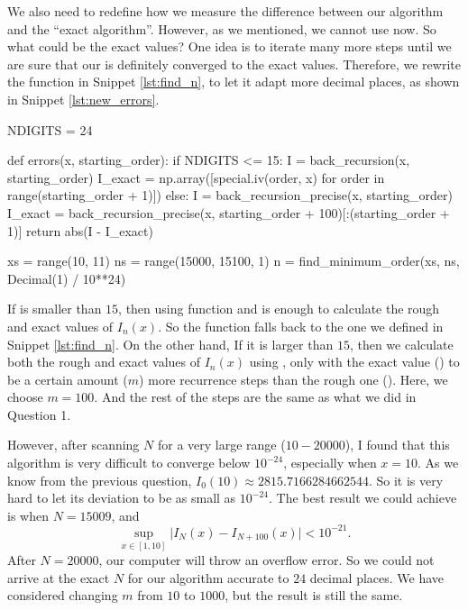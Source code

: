 We also need to redefine how we measure the difference between our algorithm and the
``exact algorithm''. However, as we mentioned, we cannot use  now.
So what could be the exact values?
One idea is to iterate many more steps until we are sure that our
 is definitely converged to the exact values.
Therefore, we rewrite the function  in Snippet \ref{lst:find_n},
to let it adapt more decimal places, as shown in Snippet \ref{lst:new_errors}.

\begin{algorithm}
    \caption{}
    \label{lst:new_errors}
    \begin{pythoncode}
        NDIGITS = 24


        def errors(x, starting_order):
            if NDIGITS <= 15:
                I = back_recursion(x, starting_order)
                I_exact = np.array([special.iv(order, x) for order in range(starting_order + 1)])
            else:
                I = back_recursion_precise(x, starting_order)
                I_exact = back_recursion_precise(x, starting_order + 100)[:(starting_order + 1)]
            return abs(I - I_exact)


        xs = range(10, 11)
        ns = range(15000, 15100, 1)
        n = find_minimum_order(xs, ns, Decimal(1) / 10**24)
        \end{pythoncode}
\end{algorithm}

If  is smaller than $15$, then using function  and
 is enough to calculate the rough and exact values of $I_n(x)$. So the
 function falls back to the one we defined in Snippet \ref{lst:find_n}. On the
other hand, If it is larger than $15$, then we calculate both the rough and exact values of
$I_n(x)$ using , only with the exact value () to
be a certain amount ($m$) more recurrence steps than the rough one (). Here, we
choose $m = 100$.
And the rest of the steps are the same as what we did in Question 1.

However, after scanning $N$ for a very large range ($10 - 20000$), I found that this
algorithm is very difficult to converge below $10^{-24}$, especially when $x = 10$.
As we know from the previous question, $I_0(10) \approx 2815.7166284662544$. So it is
very hard to let its deviation to be as small as $10^{-24}$. The best result we
could achieve is when $N = 15009$, and
%
\begin{equation}
    \sup_{x \in [1, 10]} \lvert I_{N}(x) - I_{N+100}(x) \rvert < 10^{-21}.
\end{equation}
%
After $N = 20000$, our computer will throw an overflow error. So we could not
arrive at the exact $N$ for our algorithm accurate to $24$ decimal places.
We have considered changing $m$ from $10$ to $1000$, but the result is still
the same.

